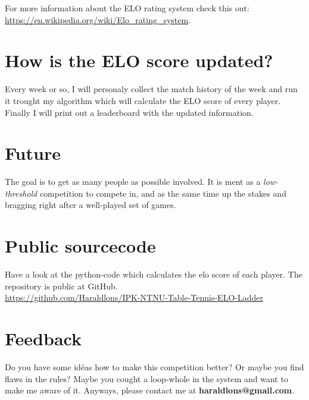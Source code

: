 \documentclass[11pt]{article}
\begin{document}
For more information about the ELO rating system check this out: \url{https://en.wikipedia.org/wiki/Elo_rating_system}.
\section{How is the ELO score updated?}
Every week or so, I will personaly collect the match history of the week and run it trought my algorithm which will calculate the ELO score of every player. Finally I will print out a leaderboard with the updated information. 
\section{Future}
The goal is to get as many people as possible involved. It is ment as a \textit{low-threshold} competition to compete in, and as the same time up the stakes and bragging right after a well-played set of games.
\section{Public sourcecode}
Have a look at the python-code which calculates the elo score of each player. The repository is public at GitHub.\\

\url{https://github.com/Haraldlons/IPK-NTNU-Table-Tennis-ELO-Ladder}
\section{Feedback}
Do you have some idéas how to make this competition better? Or maybe you find flaws in the rules? Maybe you cought a loop-whole in the system and want to make me aware of it. Anyways, please contact me at \textbf{haraldlons@gmail.com}.
\end{document}

